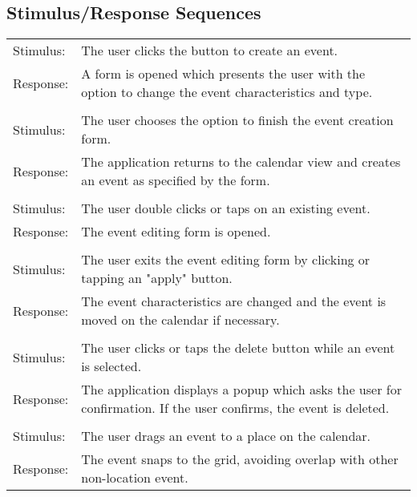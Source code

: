 \documentclass{scrreprt}
\begin{document}
\subsection{Stimulus/Response Sequences}
\begin{center}
\begin{longtable}{ p{2cm} p{13cm} }
Stimulus: & The user clicks the button to create an event. \\
Response: & A form is opened which presents the user with the option to change the event characteristics and type.\\
\\
Stimulus: & The user chooses the option to finish the event creation form. \\
Response: & The application returns to the calendar view and creates an event as specified by the form. \\
\\
Stimulus: & The user double clicks or taps on an existing event. \\
Response: & The event editing form is opened. \\
\\
Stimulus: & The user exits the event editing form by clicking or tapping an "apply" button. \\
Response: & The event characteristics are changed and the event is moved on the calendar if necessary. \\
\\
Stimulus: & The user clicks or taps the delete button while an event is selected. \\
Response: & The application displays a popup which asks the user for confirmation. If the user confirms, the event is deleted. \\
\\
Stimulus: & The user drags an event to a place on the calendar. \\
Response: & The event snaps to the grid, avoiding overlap with other non-location event. \\
\end{longtable}
\end{center}
\end{document}
